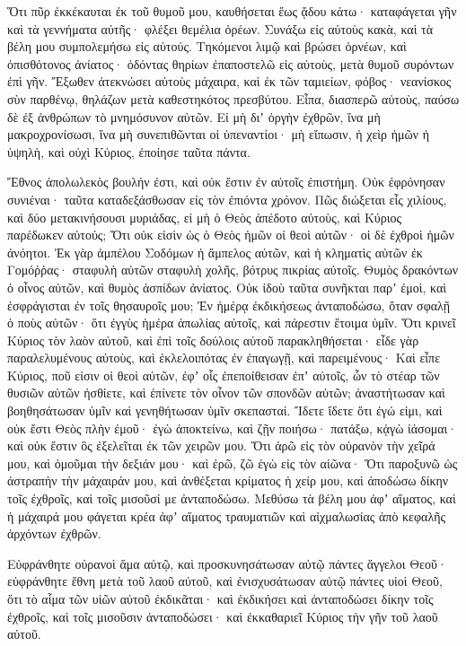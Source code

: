 {Ὅτι πῦρ ἐκκέκαυται ἐκ τοῦ θυμοῦ μου, καυθήσεται ἕως ᾄδου κάτω· καταφάγεται γῆν καὶ τὰ γεννήματα αὐτῆς· φλέξει θεμέλια ὀρέων.
Συνάξω εἰς αὐτοὺς κακὰ, καὶ τὰ βέλη μου συμπολεμήσω εἰς αὐτούς.
Τηκόμενοι λιμῷ καὶ βρώσει ὀρνέων, καὶ ὀπισθότονος ἀνίατος· ὀδόντας θηρίων ἐπαποστελῶ εἰς αὐτοὺς, μετὰ θυμοῦ συρόντων ἐπὶ γῆν.
Ἔξωθεν ἀτεκνώσει αὐτοὺς μάχαιρα, καὶ ἐκ τῶν ταμιείων, φόβος· νεανίσκος σὺν παρθένῳ, θηλάζων μετὰ καθεστηκότος πρεσβύτου.
Εἶπα, διασπερῶ αὐτοὺς, παύσω δὲ ἐξ ἀνθρώπων τὸ μνημόσυνον αὐτῶν.
Εἰ μὴ διʼ ὀργὴν ἐχθρῶν, ἵνα μὴ μακροχρονίσωσι, ἵνα μὴ συνεπιθῶνται οἱ ὑπεναντίοι· μὴ εἴπωσιν, ἡ χεὶρ ἡμῶν ἡ ὑψηλὴ, καὶ οὐχὶ Κύριος, ἐποίησε ταῦτα πάντα.
\par }{\PP {}Ἔθνος ἀπολωλεκὸς βουλήν ἐστι, καὶ οὐκ ἔστιν ἐν αὐτοῖς ἐπιστήμη.
Οὐκ ἐφρόνησαν συνιέναι· ταῦτα καταδεξάσθωσαν εἰς τὸν ἐπιόντα χρόνον.
Πῶς διώξεται εἷς χιλίους, καὶ δύο μετακινήσουσι μυριάδας, εἰ μὴ ὁ Θεὸς ἀπέδοτο αὐτοὺς, καὶ Κύριος παρέδωκεν αὐτούς;
Ὅτι οὐκ εἰσὶν ὡς ὁ Θεὸς ἡμῶν οἱ θεοὶ αὐτῶν· οἱ δὲ ἐχθροὶ ἡμῶν ἀνόητοι.
Ἐκ γὰρ ἀμπέλου Σοδόμων ἡ ἄμπελος αὐτῶν, καὶ ἡ κληματὶς αὐτῶν ἐκ Γομόῤῥας· σταφυλὴ αὐτῶν σταφυλὴ χολῆς, βότρυς πικρίας αὐτοῖς.
Θυμὸς δρακόντων ὁ οἶνος αὐτῶν, καὶ θυμὸς ἀσπίδων ἀνίατος.
Οὐκ ἰδοὺ ταῦτα συνῆκται παρʼ ἐμοὶ, καὶ ἐσφράγισται ἐν τοῖς θησαυροῖς μου;
Ἐν ἡμέρᾳ ἐκδικήσεως ἀνταποδώσω, ὅταν σφαλῇ ὁ ποὺς αὐτῶν· ὅτι ἐγγὺς ἡμέρα ἀπωλίας αὐτοῖς, καὶ πάρεστιν ἕτοιμα ὑμῖν.
Ὅτι κρινεῖ Κύριος τὸν λαὸν αὐτοῦ, καὶ ἐπὶ τοῖς δούλοις αὐτοῦ παρακληθήσεται· εἶδε γὰρ παραλελυμένους αὐτοὺς, καὶ ἐκλελοιπότας ἐν ἐπαγωγῇ, καὶ παρειμένους·
Καὶ εἶπε Κύριος, ποῦ εἰσιν οἱ θεοὶ αὐτῶν, ἐφʼ οἷς ἐπεποίθεισαν ἐπʼ αὐτοῖς,
ὧν τὸ στέαρ τῶν θυσιῶν αὐτῶν ἠσθίετε, καὶ ἐπίνετε τὸν οἶνον τῶν σπονδῶν αὐτῶν; ἀναστήτωσαν καὶ βοηθησάτωσαν ὑμῖν καὶ γενηθήτωσαν ὑμῖν σκεπασταί.
Ἴδετε ἴδετε ὅτι ἐγώ εἰμι, καὶ οὐκ ἔστι Θεὸς πλὴν ἐμοῦ· ἐγὼ ἀποκτείνω, καὶ ζῇν ποιήσω· πατάξω, κᾀγὼ ἰάσομαι· καὶ οὐκ ἔστιν ὃς ἐξελεῖται ἐκ τῶν χειρῶν μου.
Ὅτι ἀρῶ εἰς τὸν οὐρανὸν τὴν χεῖρά μου, καὶ ὀμοῦμαι τὴν δεξιάν μου· καὶ ἐρῶ, ζῶ ἐγὼ εἰς τὸν αἰῶνα·
Ὅτι παροξυνῶ ὡς ἀστραπὴν τὴν μάχαιράν μου, καὶ ἀνθέξεται κρίματος ἡ χείρ μου, καὶ ἀποδώσω δίκην τοῖς ἐχθροῖς, καὶ τοῖς μισοῦσί με ἀνταποδώσω.
Μεθύσω τὰ βέλη μου ἀφʼ αἵματος, καὶ ἡ μάχαιρά μου φάγεται κρέα ἀφʼ αἵματος τραυματιῶν καὶ αἰχμαλωσίας ἀπὸ κεφαλῆς ἀρχόντων ἐχθρῶν.
\par }{\PP {}Εὐφράνθητε οὐρανοὶ ἅμα αὐτῷ, καὶ προσκυνησάτωσαν αὐτῷ πάντες ἄγγελοι Θεοῦ· εὐφράνθητε ἔθνη μετὰ τοῦ λαοῦ αὐτοῦ, καὶ ἐνισχυσάτωσαν αὐτῷ πάντες υἱοὶ Θεοῦ, ὅτι τὸ αἷμα τῶν υἱῶν αὐτοῦ ἐκδικᾶται· καὶ ἐκδικήσει καὶ ἀνταποδώσει δίκην τοῖς ἐχθροῖς, καὶ τοῖς μισοῦσιν ἀνταποδώσει· καὶ ἐκκαθαριεῖ Κύριος τὴν γῆν τοῦ λαοῦ αὐτοῦ.
}
